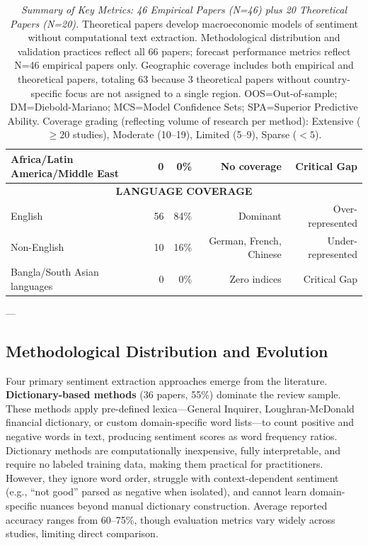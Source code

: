 \documentclass[11pt]{article}
\begin{document}
\begin{table}[H]
\begin{tabular}{|l|r|r|r|r|}
Africa/Latin America/Middle East & 0 & 0\% & No coverage & Critical Gap \\
\hline
\multicolumn{5}{|c|}{\textbf{LANGUAGE COVERAGE}} \\
\hline
English & 56 & 84\% & Dominant & Over-represented \\
Non-English & 10 & 16\% & German, French, Chinese & Under-represented \\
Bangla/South Asian languages & 0 & 0\% & Zero indices & Critical Gap \\
\hline
\end{tabular}
\caption{\textit{Summary of Key Metrics: 46 Empirical Papers (N=46) plus 20 Theoretical Papers (N=20).} Theoretical papers develop macroeconomic models of sentiment without computational text extraction. Methodological distribution and validation practices reflect all 66 papers; forecast performance metrics reflect N=46 empirical papers only. Geographic coverage includes both empirical and theoretical papers, totaling 63 because 3 theoretical papers without country-specific focus are not assigned to a single region. OOS=Out-of-sample; DM=Diebold-Mariano; MCS=Model Confidence Sets; SPA=Superior Predictive Ability. Coverage grading (reflecting volume of research per method): Extensive ($\geq 20$ studies), Moderate (10--19), Limited (5--9), Sparse ($<5$).}
\label{tab:metasummary}
\end{table}

---

\subsection{Methodological Distribution and Evolution}

Four primary sentiment extraction approaches emerge from the literature. \textbf{Dictionary-based methods} (36 papers, 55\%) dominate the review sample. These methods apply pre-defined lexica---General Inquirer, Loughran-McDonald financial dictionary, or custom domain-specific word lists---to count positive and negative words in text, producing sentiment scores as word frequency ratios. Dictionary methods are computationally inexpensive, fully interpretable, and require no labeled training data, making them practical for practitioners. However, they ignore word order, struggle with context-dependent sentiment (e.g., ``not good'' parsed as negative when isolated), and cannot learn domain-specific nuances beyond manual dictionary construction. Average reported accuracy ranges from 60--75\%, though evaluation metrics vary widely across studies, limiting direct comparison.
\end{document}
